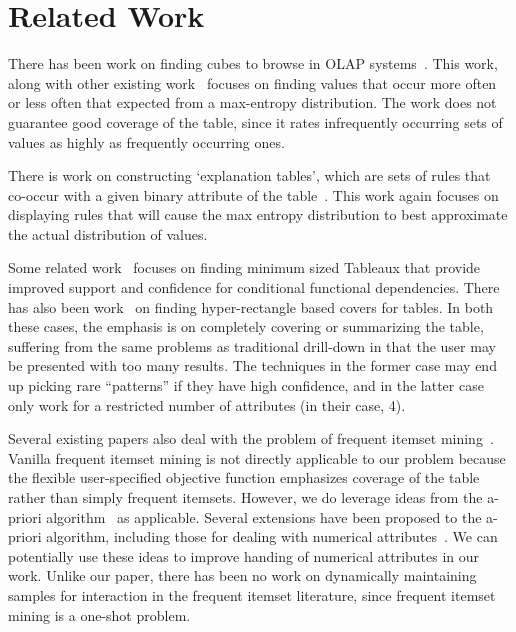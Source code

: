 

\section{Related Work}\label{sec:related}
There has been work on finding cubes to browse in OLAP systems~\cite{Sarawagi:2001:UMA:767141.767148, Sarawagi00user-adaptiveexploration, Sarawagi98discovery-drivenexploration}. This work, along with other existing work~\cite{Mampaey:2011:TMI:2020408.2020499} focuses on finding values that occur more often or less often that expected from a max-entropy distribution. The work does not guarantee good coverage of the table, since it rates infrequently occurring sets of values as highly as frequently occurring ones. 

There is work on constructing `explanation tables', which are sets of rules that co-occur with a given binary attribute of the table~\cite{DBLP:journals/pvldb/GebalyAGKS14}. This work again focuses on displaying rules that will cause the max entropy distribution to best approximate the actual distribution of values. 

Some related work~\cite{Golab_efficientand, Golab:2008:GNT:1453856.1453900} focuses on finding minimum sized Tableaux that provide improved support and confidence for conditional functional dependencies. There has also been work~\cite{Bu:2005:MSH:1083592.1083644, Lakshmanan:2002:GMA:1287369.1287435, Xiang_succinctsummarization, Geerts04tilingdatabases} on finding hyper-rectangle based covers for tables. In both these cases, the emphasis is on completely covering or 
summarizing the table, suffering from the same problems as traditional drill-down in that the user may be presented with
too many results. The techniques in the former case may end up picking rare ``patterns'' if they have high confidence, and in the latter case only work for a restricted number of attributes (in their case, 4). 

Several existing papers also deal with the problem of frequent itemset mining~\cite{apriori, 1411744, Han:2000:MFP:342009.335372}. Vanilla frequent itemset mining is not directly applicable to our problem because the flexible user-specified objective function emphasizes coverage of the table rather than simply frequent itemsets.  However, we do leverage ideas from the a-priori algorithm~\cite{apriori} as applicable. Several extensions have been proposed to the a-priori algorithm, including those for dealing with numerical attributes~\cite{Srikant:1996:MQA:233269.233311, Miller:1997:ARO:253260.253361}. We can potentially use these ideas to improve handing of numerical attributes in our work. Unlike our paper, there has been no work on dynamically maintaining samples for interaction in the frequent itemset literature, since frequent itemset mining is a one-shot problem.

